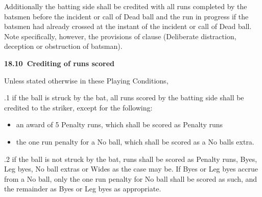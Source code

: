 \documentclass[12pt]{article}
\begin{document}
\vspace{\baselineskip}
{\fontsize{9pt}{10.8pt}\selectfont Additionally the batting side shall be credited with all runs completed by the batsmen before the incident or call of Dead ball and the run in progress if the batsmen had already crossed at the instant of the incident or call of Dead ball. Note specifically, however, the provisions of clause (Deliberate distraction, deception or obstruction of batsman).\par}\par


\vspace{\baselineskip}
{\fontsize{11pt}{13.2pt}\selectfont \textbf{18.10\  Crediting of runs scored}\par}\par


\vspace{\baselineskip}
{\fontsize{9pt}{10.8pt}\selectfont Unless stated otherwise in these Playing Conditions,\par}\par


\vspace{\baselineskip}
\begin{adjustwidth}{0.5in}{0.21in}
{\fontsize{9pt}{10.8pt}.1 if the ball is struck by the bat, all runs scored by the batting side shall be credited to the striker, except for the following:\par}\par

\end{adjustwidth}


\vspace{\baselineskip}
\begin{itemize}
	\item {\fontsize{9pt}{10.8pt}\selectfont an award of 5 Penalty runs, which shall be scored as Penalty runs\par}\par


\vspace{\baselineskip}
	\item {\fontsize{9pt}{10.8pt}\selectfont the one run penalty for a No ball, which shall be scored as a No balls extra.\par}
\end{itemize}\par


\vspace{\baselineskip}
\begin{adjustwidth}{0.5in}{0.17in}
{\fontsize{9pt}{10.8pt}.2 if the ball is not struck by the bat, runs shall be scored as Penalty runs, Byes, Leg byes, No ball extras or Wides as the case may be. If Byes or Leg byes accrue from a No ball, only the one run penalty for No ball shall be scored as such, and the remainder as Byes or Leg byes as appropriate.\par}\par

\end{adjustwidth}
\end{document}
